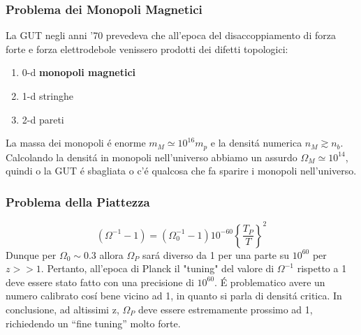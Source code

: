 \documentclass[12pt, a4paper]{article}
\begin{document}
\subsubsection{Problema dei Monopoli Magnetici}
La GUT negli anni '70 prevedeva che all'epoca del disaccoppiamento di forza forte e forza elettrodebole venissero prodotti dei difetti topologici:
\begin{enumerate}
\item 0-d \textbf{monopoli magnetici}
\item 1-d stringhe
\item 2-d pareti
\end{enumerate}
La massa dei monopoli \'{e} enorme $m_M \simeq 10^{16} m_p$  e la densit\'{a} numerica $n_M \gtrsim n_b $. Calcolando la densit\'{a} in monopoli nell'universo abbiamo un assurdo $\Omega_M\simeq10^{14}$, quindi o la GUT \'{e} sbagliata o c'\'{e} qualcosa che fa sparire i monopoli nell'universo.
\subsubsection{Problema della Piattezza}
\begin{equation}
(\Omega^{-1}-1)=(\Omega_0^{-1}-1)10^{-60}\left\{\frac{T_P}{T}\right\}^2
\end{equation}
Dunque per $\Omega_0 \sim 0.3 $ allora $\Omega_P$ sar\'{a} diverso da 1 per una parte su $10^{60}$ per $z>>1$. Pertanto, all'epoca di Planck il "tuning" del valore di $\Omega^{-1}$ rispetto a 1 deve essere stato fatto con una precisione di $10^{60}$. \'{E} problematico avere un numero calibrato cos\'{i} bene vicino ad 1, in quanto si parla di densit\'{a} critica. In conclusione, ad altissimi z, $\Omega_P $ deve essere estremamente prossimo ad 1, richiedendo un “fine tuning” molto forte.
\end{document}
